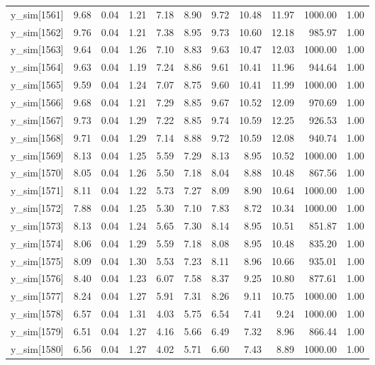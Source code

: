 \begin{table}[ht]
\begin{tabular}{rrrrrrrrrrr}
  y\_sim[1561] & 9.68 & 0.04 & 1.21 & 7.18 & 8.90 & 9.72 & 10.48 & 11.97 & 1000.00 & 1.00 \\ 
  y\_sim[1562] & 9.76 & 0.04 & 1.21 & 7.38 & 8.95 & 9.73 & 10.60 & 12.18 & 985.97 & 1.00 \\ 
  y\_sim[1563] & 9.64 & 0.04 & 1.26 & 7.10 & 8.83 & 9.63 & 10.47 & 12.03 & 1000.00 & 1.00 \\ 
  y\_sim[1564] & 9.63 & 0.04 & 1.19 & 7.24 & 8.86 & 9.61 & 10.41 & 11.96 & 944.64 & 1.00 \\ 
  y\_sim[1565] & 9.59 & 0.04 & 1.24 & 7.07 & 8.75 & 9.60 & 10.41 & 11.99 & 1000.00 & 1.00 \\ 
  y\_sim[1566] & 9.68 & 0.04 & 1.21 & 7.29 & 8.85 & 9.67 & 10.52 & 12.09 & 970.69 & 1.00 \\ 
  y\_sim[1567] & 9.73 & 0.04 & 1.29 & 7.22 & 8.85 & 9.74 & 10.59 & 12.25 & 926.53 & 1.00 \\ 
  y\_sim[1568] & 9.71 & 0.04 & 1.29 & 7.14 & 8.88 & 9.72 & 10.59 & 12.08 & 940.74 & 1.00 \\ 
  y\_sim[1569] & 8.13 & 0.04 & 1.25 & 5.59 & 7.29 & 8.13 & 8.95 & 10.52 & 1000.00 & 1.00 \\ 
  y\_sim[1570] & 8.05 & 0.04 & 1.26 & 5.50 & 7.18 & 8.04 & 8.88 & 10.48 & 867.56 & 1.00 \\ 
  y\_sim[1571] & 8.11 & 0.04 & 1.22 & 5.73 & 7.27 & 8.09 & 8.90 & 10.64 & 1000.00 & 1.00 \\ 
  y\_sim[1572] & 7.88 & 0.04 & 1.25 & 5.30 & 7.10 & 7.83 & 8.72 & 10.34 & 1000.00 & 1.00 \\ 
  y\_sim[1573] & 8.13 & 0.04 & 1.24 & 5.65 & 7.30 & 8.14 & 8.95 & 10.51 & 851.87 & 1.00 \\ 
  y\_sim[1574] & 8.06 & 0.04 & 1.29 & 5.59 & 7.18 & 8.08 & 8.95 & 10.48 & 835.20 & 1.00 \\ 
  y\_sim[1575] & 8.09 & 0.04 & 1.30 & 5.53 & 7.23 & 8.11 & 8.96 & 10.66 & 935.01 & 1.00 \\ 
  y\_sim[1576] & 8.40 & 0.04 & 1.23 & 6.07 & 7.58 & 8.37 & 9.25 & 10.80 & 877.61 & 1.00 \\ 
  y\_sim[1577] & 8.24 & 0.04 & 1.27 & 5.91 & 7.31 & 8.26 & 9.11 & 10.75 & 1000.00 & 1.00 \\ 
  y\_sim[1578] & 6.57 & 0.04 & 1.31 & 4.03 & 5.75 & 6.54 & 7.41 & 9.24 & 1000.00 & 1.00 \\ 
  y\_sim[1579] & 6.51 & 0.04 & 1.27 & 4.16 & 5.66 & 6.49 & 7.32 & 8.96 & 866.44 & 1.00 \\ 
  y\_sim[1580] & 6.56 & 0.04 & 1.27 & 4.02 & 5.71 & 6.60 & 7.43 & 8.89 & 1000.00 & 1.00 \\ 

\end{tabular}
\end{table}
